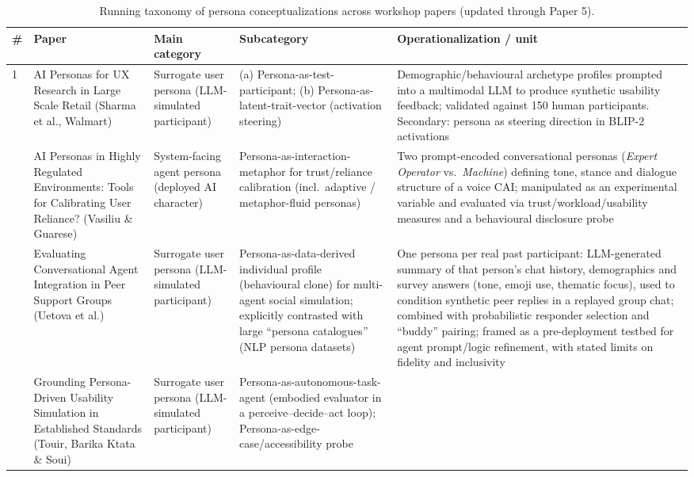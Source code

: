 \begin{table}[t]
\centering
\caption{Running taxonomy of persona conceptualizations across workshop papers (updated through Paper 5).}
\label{tab:persona-taxonomy}
\small
\begin{tabular}{p{0.5cm} p{3.6cm} p{3.4cm} p{3.6cm} p{3.6cm}}
\toprule
\textbf{\#} & \textbf{Paper} & \textbf{Main category} & \textbf{Subcategory} & \textbf{Operationalization / unit} \\
\midrule
1 & AI Personas for UX Research in Large Scale Retail (Sharma et al., Walmart) &
Surrogate user persona (LLM-simulated participant) &
(a) Persona-as-test-participant; (b) Persona-as-latent-trait-vector (activation steering) &
Demographic/behavioural archetype profiles prompted into a multimodal LLM to produce synthetic usability feedback; validated against 150 human participants. Secondary: persona as steering direction in BLIP-2 activations \\
\addlinespace
2 & AI Personas in Highly Regulated Environments: Tools for Calibrating User Reliance? (Vasiliu \& Guarese) &
System-facing agent persona (deployed AI character) &
Persona-as-interaction-metaphor for trust/reliance calibration (incl.\ adaptive / metaphor-fluid personas) &
Two prompt-encoded conversational personas (\textit{Expert Operator} vs.\ \textit{Machine}) defining tone, stance and dialogue structure of a voice CAI; manipulated as an experimental variable and evaluated via trust/workload/usability measures and a behavioural disclosure probe \\
\addlinespace
3 & Evaluating Conversational Agent Integration in Peer Support Groups (Uetova et al.) &
Surrogate user persona (LLM-simulated participant) &
Persona-as-data-derived individual profile (behavioural clone) for multi-agent social simulation; explicitly contrasted with large ``persona catalogues'' (NLP persona datasets) &
One persona per real past participant: LLM-generated summary of that person's chat history, demographics and survey answers (tone, emoji use, thematic focus), used to condition synthetic peer replies in a replayed group chat; combined with probabilistic responder selection and ``buddy'' pairing; framed as a pre-deployment testbed for agent prompt/logic refinement, with stated limits on fidelity and inclusivity \\
\addlinespace
4 & Grounding Persona-Driven Usability Simulation in Established Standards (Touir, Barika Ktata \& Soui) &
Surrogate user persona (LLM-simulated participant) &
Persona-as-autonomous-task-agent (embodied evaluator in a perceive--decide--act loop); Persona-as-edge-case/accessibility probe &

\end{tabular}
\end{table}
